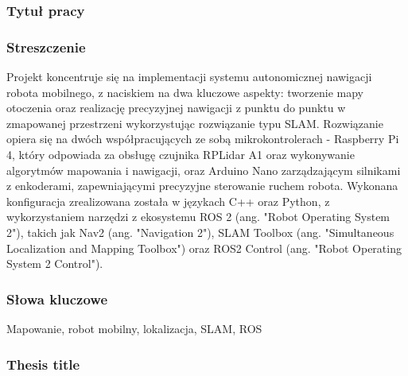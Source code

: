 \documentclass[a4paper,twoside,12pt]{book}
\begin{document}


\cleardoublepage

\rmfamily\normalfont
\pagestyle{empty}


\subsubsection*{Tytuł pracy} 
\Title
\subsubsection*{Streszczenie}  
Projekt koncentruje się na implementacji systemu autonomicznej nawigacji robota mobilnego, z naciskiem na dwa kluczowe aspekty: tworzenie mapy otoczenia oraz realizację precyzyjnej nawigacji z punktu do punktu w zmapowanej przestrzeni wykorzystując rozwiązanie typu SLAM. Rozwiązanie opiera się na dwóch współpracujących ze sobą mikrokontrolerach - Raspberry Pi 4, który odpowiada za obsługę czujnika RPLidar A1 oraz wykonywanie algorytmów mapowania i nawigacji, oraz Arduino Nano zarządzającym silnikami z enkoderami, zapewniającymi precyzyjne sterowanie ruchem robota. Wykonana konfiguracja zrealizowana została w językach C++ oraz Python, z wykorzystaniem narzędzi z ekosystemu ROS 2 (ang. "Robot Operating System 2"), takich jak Nav2 (ang. "Navigation 2"), SLAM Toolbox (ang. "Simultaneous Localization and Mapping Toolbox") oraz ROS2 Control (ang. "Robot Operating System 2 Control").


\subsubsection*{Słowa kluczowe} 
Mapowanie, robot mobilny, lokalizacja, SLAM, ROS
\subsubsection*{Thesis title} 
\begin{otherlanguage}{british}
\TitleAlt
\end{otherlanguage}
\end{document}
